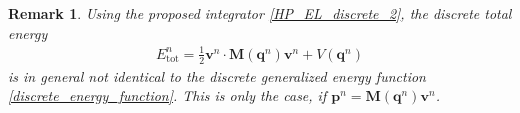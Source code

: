 \documentclass{multibody2023_full_paper}
\newtheorem{remark}[theorem]{Remark}
\newtheorem{definition}[theorem]{Definition}
\DeclareMathOperator{\D}{D}
\newcommand{\inv}{^{-1}}
\renewcommand{\vec}[1]{\ensuremath{\mbox{$\mathbf{#1}$}}}
\newcommand{\DG}{\overline{\mathsf{D}}}
\newcommand{\npe}{^{n+1}}
\newcommand{\npeh}{^{n+1/2}}
\newcommand{\n}{^{n}}
\begin{document}
\begin{remark}
    Using the proposed integrator \eqref{HP_EL_discrete_2}, the discrete total energy
    \begin{align}
        E_\mathrm{tot}\n = \frac{1}{2}\vec{v}\n \cdot \vec{M}(\vec{q}\n) \vec{v}\n + V(\vec{q}\n) \label{discrete_total_energy}
    \end{align}
    is in general not identical to the discrete generalized energy function \eqref{discrete_energy_function}. This is only the case, if $\vec{p}\n = \vec{M}(\vec{q}\n)\vec{ v}\n$.
\end{remark}


\end{document}
